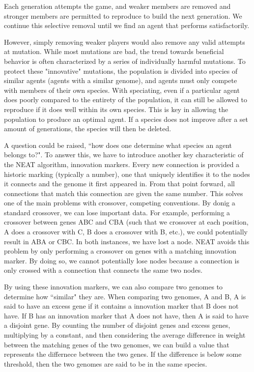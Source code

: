 \documentclass[12pt]{article}
\begin{document}
\begin{flushleft}
Each generation attempts the game, and weaker members are removed and stronger members are permitted to reproduce to build the next generation. We continue this selective removal until we find an agent that performs satisfactorily.

However, simply removing weaker players would also remove any valid attempts at mutation. While most mutations are bad, the trend towards beneficial behavior is often characterized by a series of individually harmful mutations. To protect these "innovative" mutations, the population is divided into species of similar agents (agents with a similar genome), and agents must only compete with members of their own species. With speciating, even if a particular agent does poorly compared to the entirety of the population, it can still be allowed to reproduce if it does well within its own species. This is key in allowing the population to produce an optimal agent. If a species does not improve after a set amount of generations, the species will then be deleted.

A question could be raised, ``how does one determine what species an agent belongs to?". To answer this, we have to introduce another key characteristic of the NEAT algorithm, innovation markers. Every new connection is provided a historic marking (typically a number), one that uniquely identifies it to the nodes it connects and the genome it first appeared in. From that point forward, all connections that match this connection are given the same number. This solves one of the main problems with crossover, competing conventions. By donig a standard crossover, we can lose important data. For example, performing a crossover between genes ABC and CBA (such that we crossover at each position, A does a crossover with C, B does a crossover with B, etc.), we could potentially result in ABA or CBC. In both instances, we have lost a node. NEAT avoids this problem by only performing a crossover on genes with a matching innovation marker. By doing so, we cannot potentially lose nodes because a connection is only crossed with a connection that connects the same two nodes.

By using these innovation markers, we can also compare two genomes to determine how ``similar" they are. When comparing two genomes, A and B, A is said to have an excess gene if it contains a innovation marker that B does not have. If B has an innovation marker that A does not have, then A is said to have a disjoint gene. By counting the number of disjoint genes and excess genes, multiplying by a constant, and then considering the average difference in weight between the matching genes of the two genomes, we can build a value that represents the differnece between the two genes. If the difference is below some threshold, then the two genomes are said to be in the same species.


\end{flushleft}
\end{document}
